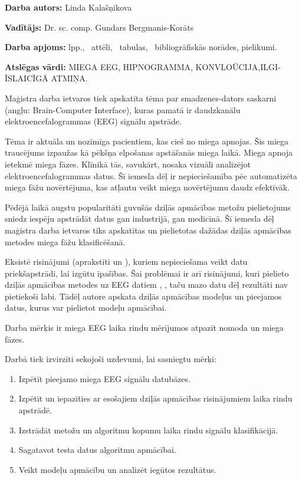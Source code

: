 \documentclass[12pt,paper=A4]{report}
\newcounter{nofappendices}
\begin{document}
\textbf{Darba autors:} Linda Kalašņikova

\textbf{Vadītājs:} Dr. sc. comp. Gundars Bergmanis-Korāts

\textbf{Darba apjoms:} \pageref{LastPage} lpp., \totalfigures\  attēli, \totaltables\ tabulas, \ bibliogrāfiskās norādes,  pielikumi.

\textbf{Atslēgas vārdi:} MIEGA EEG, HIPNOGRAMMA, KONVLOŪCIJA,ILGI-ĪSLAICĪGĀ ATMIŅA.
\vspace{5mm}

Maģistra darba ietvaros tiek apskatīta tēma par smadzenes-dators saskarni (angļu: Brain-Computer Interface), kuras pamatā ir daudzkanālu elektroencefalogrammas (EEG) signālu apstrāde.

Tēma ir aktuāla un nozīmīga pacientiem, kas cieš no miega apnojas. Šis miega traucējums izpaužas kā pēkšņa elpošanas apstāšanās miega laikā.  Miega apnoja ietekmē miega fāzes. Klīnikā tās, savukārt, nosaka vizuāli analizējot elektroencefalogrammas datus. Šī iemesla dēļ ir nepieciešamība pēc automatizēta miega fāžu novērtējuma, kas atļautu veikt miega novērtējumu daudz efektīvāk. 

Pēdējā laikā augstu popularitāti guvušās dziļās apmācības metožu pielietojums sniedz iespēju apstrādāt datus gan industrijā, gan medicīnā. Šī iemesla dēļ maģistra darba ietvaros tiks apskatītas un pielietotas dažādas dziļās apmācības metodes miega fāžu klasificēšanā. 


Eksistē risinājumi (aprakstīti \cite{rahman2018sleep} un \cite{shi2015multi}), kuriem nepieciešama veikt datu priekšapstrādi, lai izgūtu īpašības. Šai problēmai ir arī risinājumi, kuri pielieto dziļās apmācības metodes uz EEG datiem \cite{git1}, \cite{git2}, taču mazo datu dēļ rezultāti nav pietiekoši labi. Tādēļ autore apskata dziļās apmācības modeļus un pieejamos datus, kurus var pielietot modeļu apmācībai.

Darba mērķis ir miega EEG laika rindu mērījumos atpazīt nomoda un miega fāzes. 

Darbā tiek izvirzīti sekojoši uzdevumi, lai sasniegtu mērķi:
\begin{enumerate}
\item Izpētīt pieejamo miega EEG signālu datubāzes.

\item Izpētīt un iepazīties ar esošajiem dziļās apmācības risinājumiem 
laika rindu apstrādē.

\item Izstrādāt metožu un algoritmu kopumu laika rindu signālu klasifikācijā.

\item Sagatavot testa datus algoritmu apmācībai.

\item Veikt modeļu apmācību un analizēt iegūtos rezultātus.
\end{enumerate} 
\end{document}
